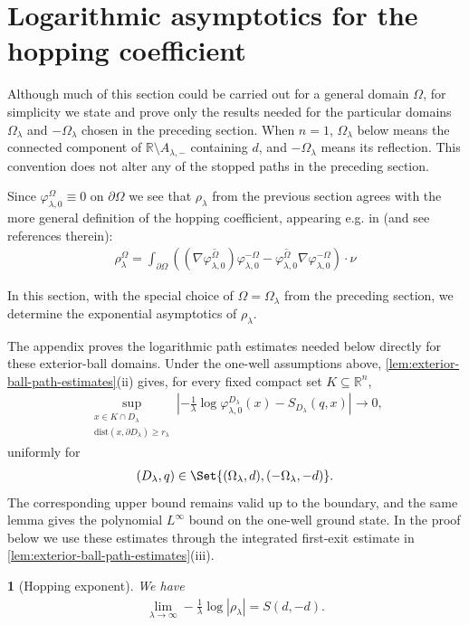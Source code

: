 \documentclass[a4paper,10pt]{article}
\numberwithin{equation}{section}
\theoremstyle{plain}
\theoremstyle{plain}
\newtheorem{lem}[thm]{\protect\lemmaname}
\theoremstyle{plain}
\theoremstyle{plain}
\theoremstyle{plain}
\theoremstyle{remark}
\theoremstyle{definition}
\providecommand{\lemmaname}{Lemma}
\newcommand{\RR}{\mathbb{R}}
\newcommand{\vf}{\varphi}
\newcommand{\dist}{\mathrm{dist}}
\newcommand{\abs}[1]{\left\lvert#1\right\rvert}
\newcommand{\eq}[1]{\begin{align*}#1\end{align*}}
\newcommand{\eql}[1]{\begin{align}#1\end{align}}
\newcommand{\br}[1]{\left(#1\right)}
\begin{document}
\section{Logarithmic asymptotics for the hopping coefficient}

Although much of this section could be carried out for a general domain
$\Omega$, for simplicity we state and prove only the results needed for
the particular domains $\Omega_\lambda$ and $-\Omega_\lambda$ chosen in
the preceding section. When $n=1$, $\Omega_\lambda$ below means the
connected component of $\RR\setminus A_{\lambda,-}$ containing $d$, and
$-\Omega_\lambda$ means its reflection. This convention does not alter any
of the stopped paths in the preceding section.

Since $\vf_{\lambda,0}^{\Omega}\equiv0$ on
$\partial\Omega$ we see that $\rho_\lambda$ from the previous section agrees with the more general definition of the hopping coefficient, appearing e.g. in \cite[Eq.~(3.1)]{Fefferman2025} (and see references
therein):
\eql{
\rho_\lambda^\Omega
=\int_{\partial\Omega}
\left(
\br{\nabla\overline{\vf_{\lambda,0}^\Omega}}
\vf_{\lambda,0}^{-\Omega}
-
\overline{\vf_{\lambda,0}^\Omega}
\nabla\vf_{\lambda,0}^{-\Omega}
\right)\cdot\nu
\label{eq:hopping coefficient}
}

In this section, with the special choice of $\Omega=\Omega_\lambda$ from the preceding section, we determine the exponential asymptotics of $\rho_\lambda$.

The appendix proves the logarithmic path estimates needed below directly
for these exterior-ball domains. Under the one-well assumptions above,
\cref{lem:exterior-ball-path-estimates}(ii) gives, for every fixed compact
set $K\subseteq\RR^n$,
\eq{
\sup_{\substack{x\in K\cap D_\lambda\\
\dist(x,\partial D_\lambda)\geq r_\lambda}}
\left|
-\frac1\lambda\log\vf_{\lambda,0}^{D_\lambda}(x)
-S_{D_\lambda}(q,x)
\right|
\longrightarrow0,
}
uniformly for
\eq{
(D_\lambda,q)
\in
\Set{
(\Omega_\lambda,d),
(-\Omega_\lambda,-d)
}.
}
The corresponding upper bound remains valid up to the boundary, and the
same lemma gives the polynomial $L^\infty$ bound on the one-well ground
state. In the proof below we use these estimates through the integrated
first-exit estimate in
\cref{lem:exterior-ball-path-estimates}(iii).

\begin{lem}[Hopping exponent]
\label{lem:hopping-exponent}
We have
\eql{
\lim_{\lambda\to\infty}
-\frac1\lambda\log\abs{\rho_\lambda}
=
S(d,-d).
\label{eq:hopping-exponent}
}
\end{lem}
\end{document}
